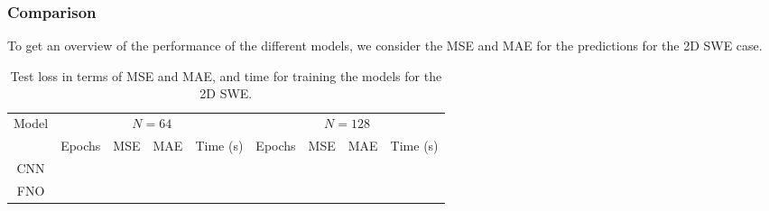 \subsubsection*{Comparison}
To get an overview of the performance of the different models, we consider the MSE and MAE for the predictions for the 2D SWE case.
\begin{table}[H]
    \centering
    \small %
    \begin{tabular}{c|cccc|cccc}
        Model & \multicolumn{4}{c|}{$N = 64$} & \multicolumn{4}{c}{$N = 128$} \\
        \cline{2-9}
        & Epochs & MSE & MAE & Time (s) & Epochs & MSE & MAE & Time (s) \\
        \hline
        CNN  &
         &
         & 
         &
         &
         &
         &
         &
         
        \\
        \hline
        FNO  &
         &
         &
         &
         &
         &
         &
         &
        
        \\
        \hline
    \end{tabular}
    \caption{Test loss in terms of MSE and MAE, and time for training the models for the 2D SWE.}\label{tab:results_2D_comparison}
\end{table}
